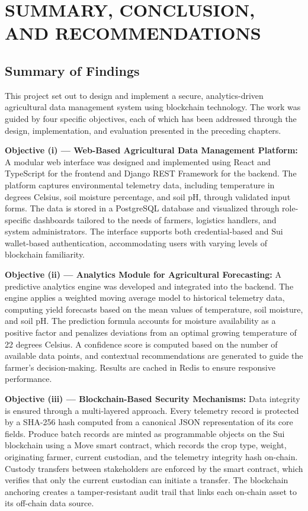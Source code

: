 \chapter{SUMMARY, CONCLUSION, AND RECOMMENDATIONS}

\section{Summary of Findings}

This project set out to design and implement a secure, analytics-driven agricultural data management system using blockchain technology. The work was guided by four specific objectives, each of which has been addressed through the design, implementation, and evaluation presented in the preceding chapters.

\textbf{Objective (i) --- Web-Based Agricultural Data Management Platform:} A modular web interface was designed and implemented using React and TypeScript for the frontend and Django REST Framework for the backend. The platform captures environmental telemetry data, including temperature in degrees Celsius, soil moisture percentage, and soil pH, through validated input forms. The data is stored in a PostgreSQL database and visualized through role-specific dashboards tailored to the needs of farmers, logistics handlers, and system administrators. The interface supports both credential-based and Sui wallet-based authentication, accommodating users with varying levels of blockchain familiarity.

\textbf{Objective (ii) --- Analytics Module for Agricultural Forecasting:} A predictive analytics engine was developed and integrated into the backend. The engine applies a weighted moving average model to historical telemetry data, computing yield forecasts based on the mean values of temperature, soil moisture, and soil pH. The prediction formula accounts for moisture availability as a positive factor and penalizes deviations from an optimal growing temperature of 22 degrees Celsius. A confidence score is computed based on the number of available data points, and contextual recommendations are generated to guide the farmer's decision-making. Results are cached in Redis to ensure responsive performance.

\textbf{Objective (iii) --- Blockchain-Based Security Mechanisms:} Data integrity is ensured through a multi-layered approach. Every telemetry record is protected by a SHA-256 hash computed from a canonical JSON representation of its core fields. Produce batch records are minted as programmable objects on the Sui blockchain using a Move smart contract, which records the crop type, weight, originating farmer, current custodian, and the telemetry integrity hash on-chain. Custody transfers between stakeholders are enforced by the smart contract, which verifies that only the current custodian can initiate a transfer. The blockchain anchoring creates a tamper-resistant audit trail that links each on-chain asset to its off-chain data source.

